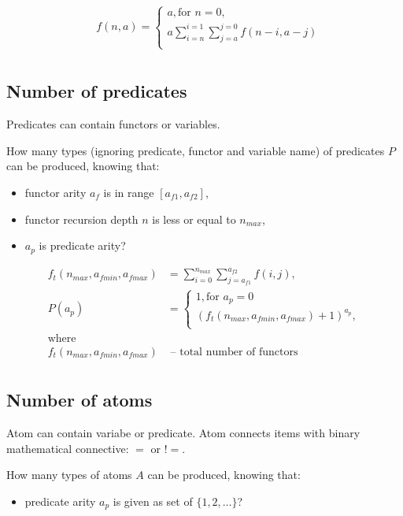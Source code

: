 \begin{align*}
	&f(n, a) =
	\begin{cases}
		a, \text{for } n = 0, \\
		a \sum_{i=n}^{i=1} \sum_{j=a}^{j=0} f(n-i,a-j) \\
	\end{cases} \\
\end{align*}

\subsection{Number of predicates}

Predicates can contain functors or variables.

How many types (ignoring predicate, functor and variable name) of predicates $P$ can be produced, knowing that:
\begin{itemize}
	\item functor arity $a_f$ is in range $[a_{f1}, a_{f2}]$,
	\item functor recursion depth $n$ is less or equal to $n_{max}$,
	\item $a_p$ is predicate arity?
\end{itemize}

\begin{align*}
	f_t(n_{max}, a_{fmin}, a_{fmax}) &= \sum_{i=0}^{n_{max}} \sum_{j=a_{f1}}^{a_{f2}} f(i, j), \\
	P(a_p) &=
	\begin{cases}
		1, \text{for } a_p = 0 \\
		(f_t(n_{max}, a_{fmin}, a_{fmax}) + 1)^{a_p}, \\
	\end{cases} \\
	\text{where} \\
	f_t(n_{max}, a_{fmin}, a_{fmax}) & \text{ -- total number of functors} \\
\end{align*}

\subsection{Number of atoms}

Atom can contain variabe or predicate. Atom connects items with binary mathematical connective: $=$ or $!=$.

How many types of atoms $A$ can be produced, knowing that:
\begin{itemize}
	\item predicate arity $a_p$ is given as set of $\{1,2,\dots\}$?
\end{itemize}

